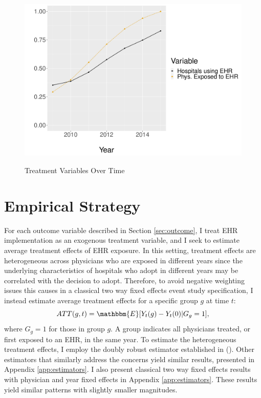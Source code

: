 \documentclass[12pt]{article}
\begin{document}
\begin{figure}[t]
\centering
\captionsetup{width=.45\linewidth}
    \caption{Treatment Variables Over Time}
    \includegraphics[scale=.5]{Objects/sum_stats_year.pdf}
    \label{fig:treatmentgraph}
\end{figure}



\section{Empirical Strategy}\label{sec:empstrat}

For each outcome variable described in Section \ref{sec:outcome}, I treat EHR implementation as an exogenous treatment variable, and I seek to estimate average treatment effects of EHR exposure. In this setting, treatment effects are heterogeneous across physicians who are exposed in different years since the underlying characteristics of hospitals who adopt in different years may be correlated with the decision to adopt. Therefore, to avoid negative weighting issues this causes in a classical two way fixed effects event study specification, I instead estimate average treatment effects for a specific group $g$ at time $t$: 
$$ATT(g,t)=\mathbbm{E}[Y_t(g)-Y_t(0)|G_g=1],$$
where $G_g=1$ for those in group $g$. A group indicates all physicians treated, or first exposed to an EHR, in the same year. To estimate the heterogeneous treatment effects, I employ the doubly robust estimator established in \citeauthor{sant2020doubly} (\citeyear{sant2020doubly}). Other estimators that similarly address the concerns yield similar results, presented in Appendix \ref{app:estimators}. I also present classical two way fixed effects results with physician and year fixed effects in Appendix \ref{app:estimators}. These results yield similar patterns with slightly smaller magnitudes. 
\end{document}
